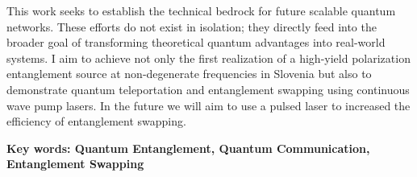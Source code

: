 \documentclass{article}
\begin{document}
\par This work seeks to establish the technical bedrock for future scalable quantum networks. These efforts do not exist in isolation;
they directly feed into the broader goal of transforming theoretical quantum advantages into real-world systems.
I aim to achieve not only the first realization of a high-yield polarization entanglement source at non-degenerate
frequencies in Slovenia but also to demonstrate quantum teleportation and entanglement swapping using
continuous wave pump lasers.
In the future we will aim to use a pulsed laser to increased the efficiency of entanglement swapping.
\par\textbf{Key words: Quantum Entanglement, Quantum Communication, Entanglement Swapping}
\end{document}
